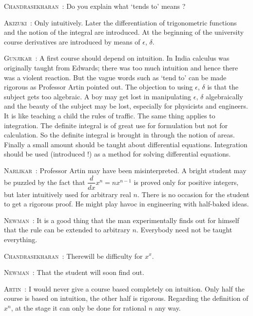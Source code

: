 \smallskip
\noindent
\textsc{Chandrasekharan}~: Do you explain what `tends to' means ?

\smallskip
\noindent
\textsc{Akizuki}~: Only intuitively. Later the differentiation of trigonometric functions and the notion of the integral are introduced. At the beginning of the university course derivatives are introduced by means of $\epsilon$, $\delta$.

\smallskip
\noindent
\textsc{Gunjikar}~: A first course should depend on intuition. In India calculus was originally taught from Edwards; there was too much intuition and hence there was a violent reaction. But the vague words such as `tend to' can be made rigorous as Professor Artin pointed out. The objection to using $\epsilon$, $\delta$ is that the subject gets too algebraic. A boy may get lost in manipulating $\epsilon$, $\delta$ algebraically and the beauty of the subject may be lost, especially for physicists and engineers. It is like teaching a child the rules of traffic. The same thing applies to integration. The definite integral is of great use for formulation but not for calculation. So the definite integral is brought in through the notion of areas. Finally a small amount should be taught about differential equations. Integration should be used (introduced !) as a method for solving differential equations.

\smallskip
\noindent
\textsc{Narlikar}~: Professor Artin may have been misinterpreted. A bright student may be puzzled by the fact that $\dfrac{d}{dx}x^{n}=nx^{n-1}$ is proved only for positive integers, but later intuitively used for arbitrary real $n$. There is no occasion for the student to get a rigorous proof. He might play havoc in engineering with half-baked ideas.

\smallskip
\noindent
\textsc{Newman}~: It is a good thing that the man experimentally finds out for himself that the rule can be extended to arbitrary $n$. Everybody need not be taught everything.

\smallskip
\noindent
\textsc{Chandrasekharan}~: There\pageoriginale will be difficulty for $x^{x}$.

\smallskip
\noindent
\textsc{Newman}~: That the student will soon find out.

\smallskip
\noindent
\textsc{Artin}~: I would never give a course based completely on intuition. Only half the course is based on intuition, the other half is rigorous. Regarding the definition of $x^{n}$, at the stage it can only be done for rational $n$ any way.

